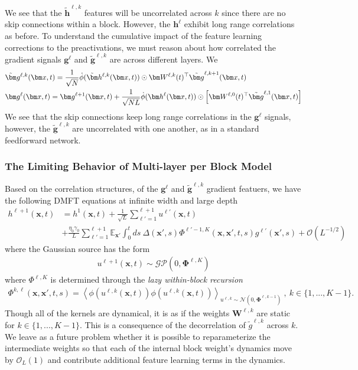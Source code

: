 \documentclass{article} %
\def\h{\bm h}
\def\x{\bm x}
\def\g{\bm g}
\def\W{\bm W}
\begin{document}
We see that the $\tilde{\h}^{\ell,k}$ features will be uncorrelated across $k$ since there are no skip connections within a block. However, the $\h^\ell$ exhibit long range correlations as before. To understand the cumulative impact of the feature learning corrections to the preactivations, we must reason about how correlated the gradient signals $\g^{\ell}$ and $\tilde{\g}^{\ell,k}$ are across different layers. We 
\begin{align}
    &\tilde\g^{\ell,k}(\x,t) = \frac{1}{\sqrt N} \dot\phi(\tilde \h^{\ell,k}(\x,t)) \odot \W^{\ell,k}(t)^\top \tilde{\g}^{\ell,k+1}(\x,t) \nonumber
    \\
    &\g^{\ell}(\x,t) = \g^{\ell+1}(\x,t) + \frac{1}{\sqrt{N L}}  \dot\phi(\h^{\ell}(\x,t)) \odot \left[ \W^{\ell,0}(t)^\top \tilde{\g}^{\ell,1}(\x,t)  \right] 
\end{align}
We see that the skip connections keep long range correlations in the $\g^\ell$ signals, however, the $\tilde{\g}^{\ell,k}$ are uncorrelated with one another, as in a standard feedforward network.

\subsubsection{The Limiting Behavior of Multi-layer per Block Model}

Based on the correlation structures, of the $\g^{\ell}$ and $\tilde{\g}^{\ell,k}$ gradient featuers, we have the following DMFT equations at infinite width and large depth
\begin{align}
    h^{\ell+1}(\x,t) &= h^{1}(\x,t) + \frac{1}{\sqrt{L}} \sum_{\ell'=1}^{\ell+1} u^{\ell'}(\x,t) \nonumber
    \\
    &+ \frac{\eta_0 \gamma_0}{L} \sum_{\ell'=1}^{\ell+1} \mathbb{E}_{\x'} \int_0^t ds  \ \Delta(\x',s) \Phi^{\ell'-1,K}(\x,\x',t,s) g^{\ell'}(\x',s) + \mathcal{O}(L^{-1/2})
\end{align}
where the Gaussian source has the form
\begin{align}
    u^{\ell+1}(\x,t) \sim \mathcal{GP}(0,\bm \Phi^{\ell,K})
\end{align}
where $\Phi^{\ell, K}$ is determined through the \textit{lazy within-block recursion} 
\begin{align}
    \Phi^{k,\ell}(\x,\x',t,s) = \left< \phi(u^{\ell,k}(\x,t)) \phi(u^{\ell,k}(\x,t)) \right>_{u^{\ell,k} \sim \mathcal{N}(0,\bm \Phi^{\ell,k-1})} \ , \ k \in \{ 1,...,K-1 \} .
\end{align}
Though all of the kernels are dynamical, it is as if the weights $\W^{\ell,k}$ are static for $k \in \{1,...,K-1\}$. This is a consequence of the decorrelation of $\tilde g^{\ell,k}$ across $k$. We leave as a future problem whether it is possible to reparameterize the intermediate weights so that each of the internal block weight's dynamics move by $\mathcal{O}_L(1)$ and contribute additional feature learning terms in the dynamics. 
\end{document}
